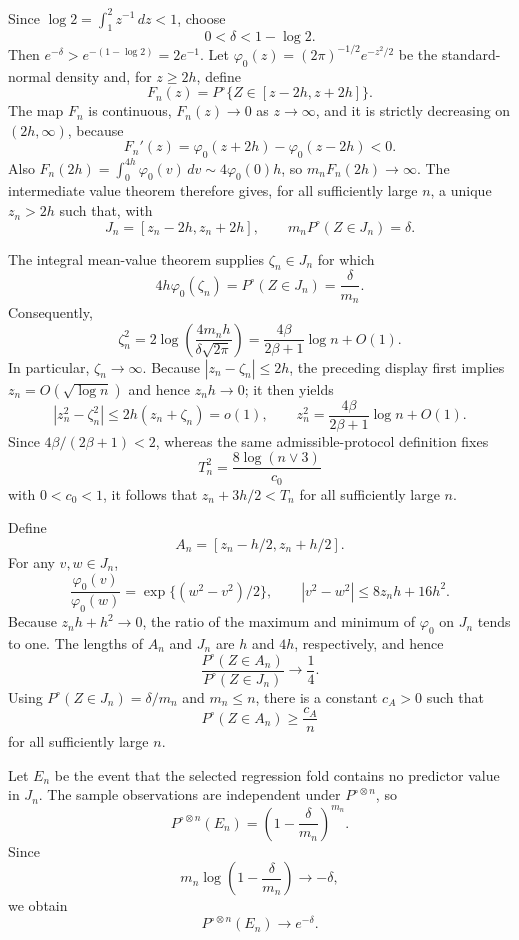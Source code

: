 Since \(\log2=\int_1^2z^{-1}\,dz<1\), choose
\[
0<\delta<1-\log2.
\]
Then \(e^{-\delta}>e^{-(1-\log2)}=2e^{-1}\). Let \(\varphi_0(z)=(2\pi)^{-1/2}e^{-z^2/2}\) be the standard-normal density and, for \(z\ge2h\), define
\[
F_n(z)=P^\circ\{Z\in[z-2h,z+2h]\}.
\]
The map \(F_n\) is continuous, \(F_n(z)\to0\) as \(z\to\infty\), and it is strictly decreasing on \((2h,\infty)\), because
\[
F_n'(z)=\varphi_0(z+2h)-\varphi_0(z-2h)<0.
\]
Also \(F_n(2h)=\int_0^{4h}\varphi_0(v)\,dv\sim4\varphi_0(0)h\), so \(m_nF_n(2h)\to\infty\). The intermediate value theorem therefore gives, for all sufficiently large \(n\), a unique \(z_n>2h\) such that, with
\[
J_n=[z_n-2h,z_n+2h],
\qquad m_nP^\circ(Z\in J_n)=\delta.
\]

The integral mean-value theorem supplies \(\zeta_n\in J_n\) for which
\[
4h\varphi_0(\zeta_n)=P^\circ(Z\in J_n)=\frac{\delta}{m_n}.
\]
Consequently,
\[
\zeta_n^2
=2\log\!\left(\frac{4m_nh}{\delta\sqrt{2\pi}}\right)
=\frac{4\beta}{2\beta+1}\log n+O(1).
\]
In particular, \(\zeta_n\to\infty\). Because \(|z_n-\zeta_n|\le2h\), the preceding display first implies \(z_n=O(\sqrt{\log n})\) and hence \(z_nh\to0\); it then yields
\[
|z_n^2-\zeta_n^2|
\le2h(z_n+\zeta_n)=o(1),
\qquad
z_n^2=\frac{4\beta}{2\beta+1}\log n+O(1).
\]
Since \(4\beta/(2\beta+1)<2\), whereas the same admissible-protocol definition fixes
\[
T_n^2=\frac{8\log(n\vee3)}{c_0}
\]
with \(0<c_0<1\), it follows that \(z_n+3h/2<T_n\) for all sufficiently large \(n\).

Define
\[
A_n=[z_n-h/2,z_n+h/2].
\]
For any \(v,w\in J_n\),
\[
\frac{\varphi_0(v)}{\varphi_0(w)}
=\exp\{(w^2-v^2)/2\},
\qquad
|v^2-w^2|\le8z_nh+16h^2.
\]
Because \(z_nh+h^2\to0\), the ratio of the maximum and minimum of \(\varphi_0\) on \(J_n\) tends to one. The lengths of \(A_n\) and \(J_n\) are \(h\) and \(4h\), respectively, and hence
\[
\frac{P^\circ(Z\in A_n)}{P^\circ(Z\in J_n)}\longrightarrow\frac14.
\]
Using \(P^\circ(Z\in J_n)=\delta/m_n\) and \(m_n\le n\), there is a constant \(c_A>0\) such that
\[
P^\circ(Z\in A_n)\ge\frac{c_A}{n}
\]
for all sufficiently large \(n\).

Let \(E_n\) be the event that the selected regression fold contains no predictor value in \(J_n\). The sample observations are independent under \(P^{\circ\otimes n}\), so
\[
P^{\circ\otimes n}(E_n)
=\left(1-\frac{\delta}{m_n}\right)^{m_n}.
\]
Since
\[
m_n\log\left(1-\frac{\delta}{m_n}\right)\longrightarrow-\delta,
\]
we obtain
\[
P^{\circ\otimes n}(E_n)\longrightarrow e^{-\delta}.
\]

